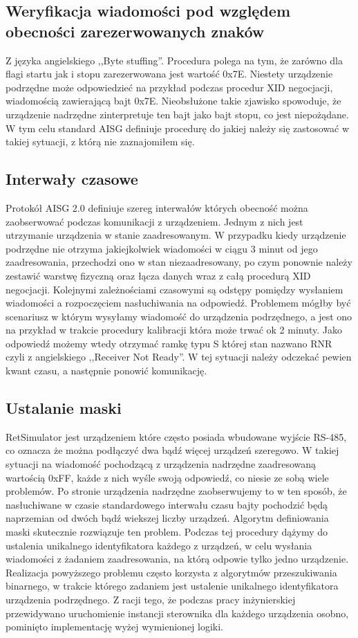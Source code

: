 \subsection{Weryfikacja wiadomości pod względem obecności zarezerwowanych znaków}
    Z języka angielskiego ,,Byte stuffing''. Procedura polega na tym, że zarówno dla flagi startu jak i stopu zarezerwowana jest wartość 0x7E.
    Niestety urządzenie podrzędne może odpowiedzieć na przykład podczas procedur XID negocjacji, wiadomością zawierającą bajt 0x7E. Nieobsłużone
    takie zjawisko spowoduje, że urządzenie nadrzędne zinterpretuje ten bajt jako bajt stopu, co jest niepożądane\cite{ISO-IEC-13239}. W tym celu standard AISG 
    definiuje procedurę do jakiej należy się zastosować w takiej sytuacji, z którą nie zaznajomiłem się.
\subsection{Interwały czasowe}
    Protokół AISG 2.0 definiuje szereg interwałów których obecność można zaobserwować podczas komunikacji z urządzeniem. Jednym z nich jest
    utrzymanie urządzenia w stanie zaadresowanym. W przypadku kiedy urządzenie podrzędne nie otrzyma jakiejkolwiek wiadomości w ciągu 3 minut
    od jego zaadresowania, przechodzi ono w stan niezaadresowany, po czym ponownie należy zestawić warstwę fizyczną oraz łącza danych wraz
    z całą procedurą XID negocjacji. Kolejnymi zależnościami czasowymi są odstępy pomiędzy wysłaniem wiadomości a rozpoczęciem nasłuchiwania na odpowiedź.
    Problemem mógłby być scenariusz w którym wysyłamy wiadomość do urządzenia podrzędnego, a jest ono na przykład w trakcie procedury kalibracji która może 
    trwać ok 2 minuty. Jako odpowiedź możemy wtedy otrzymać ramkę typu S której stan nazwano RNR czyli z angielskiego ,,Receiver Not Ready''. 
    W tej sytuacji należy odczekać pewien kwant czasu, a następnie ponowić komunikację.
\subsection{Ustalanie maski}
    RetSimulator jest urządzeniem które często posiada wbudowane wyjście RS-485, co oznacza że można podłączyć dwa bądź więcej urządzeń szeregowo. 
    W takiej sytuacji na wiadomość pochodzącą z urządzenia nadrzędne zaadresowaną wartością 0xFF, każde z nich wyśle swoją odpowiedź, co niesie ze sobą wiele problemów.
    Po stronie urządzenia nadrzędne zaobserwujemy to w ten sposób, że nasłuchiwane w czasie standardowego interwału czasu bajty
    pochodzić będą naprzemian od dwóch bądź wiekszej liczby urządzeń. Algorytm definiowania maski skutecznie rozwiązuje ten problem. 
    Podczas tej procedury dążymy do ustalenia unikalnego identyfikatora każdego z urządzeń, w celu wysłania wiadomości z żadaniem zaadresowania,
    na którą odpowie tylko jedno urządzenie. Realizacja powyższego problemu często korzysta z algorytmów przeszukiwania binarnego, w trakcie którego
    zadaniem jest ustalenie unikalnego identyfikatora urządzenia podrzędnego. Z racji tego, że podczas pracy inżynierskiej
    przewidywano uruchomienie instancji sterownika dla każdego urządzenia osobno, pominięto implementację wyżej wymienionej logiki.
